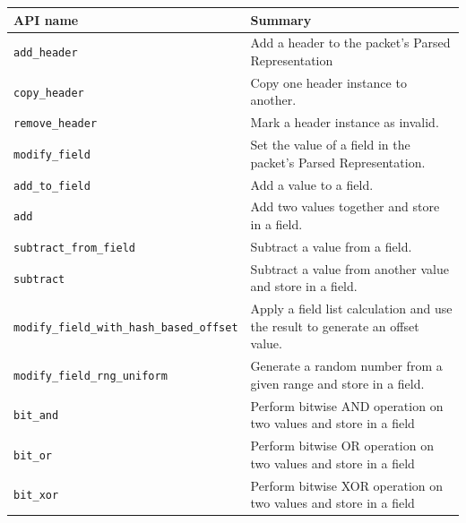 \documentclass[12pt]{article}
\begin{document}
\begin{table}[H]
\begin{center}
\begin{tabular}{| l | p{} |} \hline
\textbf{API name} &
\textbf{Summary} \\ \hline
\texttt{add_header} &
Add a header to the packet's Parsed Representation \\ \hline
\texttt{copy_header} &
Copy one header instance to another. \\ \hline
\texttt{remove_header} &
Mark a header instance as invalid. \\ \hline
\texttt{modify_field} &
Set the value of a field in the packet's Parsed Representation. \\ \hline
\texttt{add_to_field} &
Add a value to a field. \\ \hline
\texttt{add} &
Add two values together and store in a field. \\ \hline
\texttt{subtract_from_field} &
Subtract a value from a field. \\ \hline
\texttt{subtract} &
Subtract a value from another value and store in a field. \\ \hline
\texttt{modify_field_with_hash_based_offset} &
Apply a field list calculation and use the result to generate an offset value. \\ \hline
\texttt{modify_field_rng_uniform} &
Generate a random number from a given range and store in a field. \\ \hline
\texttt{bit_and} &
Perform bitwise AND operation on two values and store in a field  \\ \hline
\texttt{bit_or} &
Perform bitwise OR operation on two values and store in a field  \\ \hline
\texttt{bit_xor} &
Perform bitwise XOR operation on two values and store in a field  \\ \hline
\end{tabular}
\end{center}
\end{table}
\end{document}
